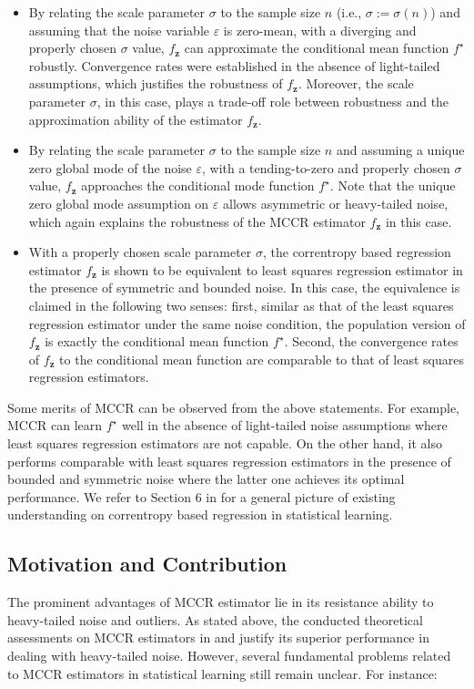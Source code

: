\documentclass[11pt]{article}
\begin{document}
\begin{itemize}
	\item By relating the scale parameter $\sigma$ to the sample size $n$ (i.e., $\sigma:=\sigma(n)$) and assuming that the noise variable $\varepsilon$ is zero-mean, with a diverging and properly chosen $\sigma$ value, $f_\mathbf{z}$ can approximate the conditional mean function $f^\star$ robustly. Convergence rates were established in the absence of light-tailed assumptions, which justifies the robustness of $f_\mathbf{z}$. Moreover, the scale parameter $\sigma$, in this case, plays a trade-off role between robustness and the approximation ability of the estimator $f_\mathbf{z}$.
	\item By relating the scale parameter $\sigma$ to the sample size $n$ and assuming a unique zero global mode of the noise $\varepsilon$, with a tending-to-zero and properly chosen $\sigma$ value, $f_\mathbf{z}$ approaches the conditional mode function $f^\star$. Note that the unique zero global mode assumption on $\varepsilon$ allows asymmetric or heavy-tailed noise, which again explains the robustness of the MCCR estimator $f_\mathbf{z}$ in this case. 
	\item With a properly chosen scale parameter $\sigma$, the correntropy based regression estimator $f_\mathbf{z}$ is shown to be equivalent to least squares regression estimator in the presence of symmetric and bounded noise. In this case, the equivalence is claimed in the following two senses: first, similar as that of the least squares regression estimator under the same noise condition, the population version of $f_\mathbf{z}$ is exactly the conditional mean function $f^\star$. Second, the convergence rates of $f_\mathbf{z}$ to the conditional mean function are comparable to that of least squares regression estimators.  
\end{itemize}
Some merits of MCCR can be observed from the above statements. For example, MCCR can learn $f^\star$ well in the absence of light-tailed noise assumptions where least squares regression estimators are not capable. On the other hand,  it also performs comparable with least squares regression estimators in the presence of bounded and symmetric noise where the latter one achieves its optimal performance. We refer to Section $6$ in \cite{feng2017statistical} for a general picture of existing understanding on correntropy based regression in statistical learning. 


\subsection{Motivation and Contribution} 
The prominent advantages of MCCR estimator lie in its resistance ability to heavy-tailed noise and outliers. As stated above, the conducted theoretical assessments on MCCR estimators in \cite{fenglearning} and \cite{feng2017statistical} justify its superior performance in dealing with heavy-tailed noise. However, several fundamental problems related to MCCR estimators in statistical learning still remain unclear. For instance: 
\medskip
\end{document}
